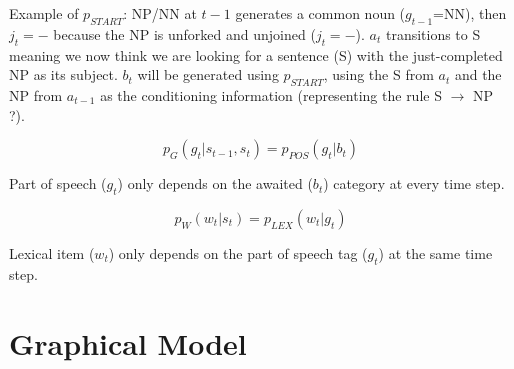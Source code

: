 \documentclass[12pt]{article}
\begin{document}
Example of $p_{START}$: NP/NN at $t-1$ generates a common noun ($g_{t-1}$=NN), then $j_t=-$ because the NP is unforked and unjoined ($j_t=-$). $a_t$ transitions to S meaning we now think we are looking for a sentence (S) with the just-completed NP as its subject. $b_{t}$ will be generated using $p_{START}$, using the S from $a_t$ and the NP from $a_{t-1}$ as the conditioning information (representing the rule S $\rightarrow$ NP ?).

\begin{equation}
p_{G}(g_t | s_{t-1},s_t) = p_{POS}(g_t|b_t)
\end{equation}

Part of speech ($g_t$) only depends on the awaited ($b_t$) category at every time step.

\begin{equation}
p_{W}(w_t|s_t) = p_{LEX}(w_t | g_t)
\end{equation}

Lexical item ($w_t$) only depends on the part of speech tag ($g_t$) at the same time step.

\section{Graphical Model}

\end{document}
